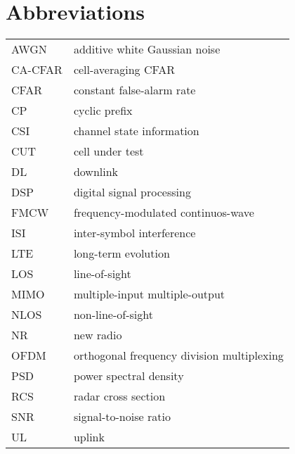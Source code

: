 \chapter*{Abbreviations} %

\begin{table}[H]
    \begin{tabular}{ll}
    	AWGN & additive white Gaussian noise \\[2px]
    	CA-CFAR & cell-averaging CFAR \\[2px]
    	CFAR & constant false-alarm rate \\[2px]
    	CP & cyclic prefix \\[2px]
    	CSI & channel state information \\[2px]
    	CUT & cell under test \\[2px]
    	DL & downlink \\[2px]
    	DSP & digital signal processing \\[2px]
    	FMCW & frequency-modulated continuos-wave \\[2px]
    	ISI & inter-symbol interference \\[2px]
        LTE & long-term evolution \\[2px]
        LOS & line-of-sight \\[2px]
        MIMO & multiple-input multiple-output \\[2px]
        NLOS & non-line-of-sight \\[2px]
        NR & new radio\\[2px]
        OFDM & orthogonal frequency division multiplexing \\[2px]
        PSD & power spectral density  \\[2px]
        RCS & radar cross section \\[2px]
        SNR & signal-to-noise ratio \\[2px]
        UL & uplink \\[2px]
        
        
    \end{tabular}
\end{table}